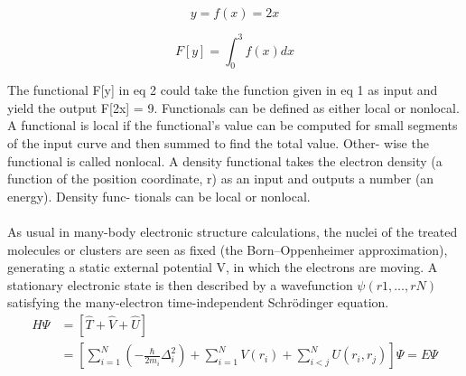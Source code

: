 \documentclass[12pt, letterpaper]{article}
\newcommand*{\1}{\hspace{1pt}}
\begin{document}
    \begin{equation}
        y = f(x) = 2x
    \end{equation}
    
    \begin{equation}
        F[y] = \int ^{3} _{0} f(x) dx
    \end{equation}
    
    The functional F[y] in eq 2 could take the function given in
    eq 1 as input and yield the output F[2x] = 9. Functionals can
    be deﬁned as either local or nonlocal. A functional is local if the
    functional’s value can be computed for small segments of the
    input curve and then summed to ﬁnd the total value. Other-
    wise the functional is called nonlocal. A density functional takes
    the electron density (a function of the position coordinate, r) as
    an input and outputs a number (an energy). Density func-
    tionals can be local or nonlocal. \\ 
     \\ 

    As usual in many-body electronic structure calculations, the nuclei of the treated molecules or clusters are seen as fixed (the Born–Oppenheimer 
    approximation), generating a static external potential V, in which the electrons are moving. A stationary electronic state is then described by a 
    wavefunction $\psi (r1, …, rN)$ satisfying the many-electron time-independent Schrödinger equation. 
    \begin{equation}
        \begin{split}
        \hat{H} \Psi & = \left[\hat{T} + \hat{V} + \hat{U} \right] \\
        & =\left[\sum ^{N} _{i=1}\left(-\frac{\hbar}{2m_{i}}\Delta ^{2}_{i}\right)+ \sum^{N}_{i=1}V(r_{i})+\sum^{N}_{i<j}U(r_{i},r_{j})\right]\Psi = E\Psi
        \end{split}
    \end{equation}
\end{document}
